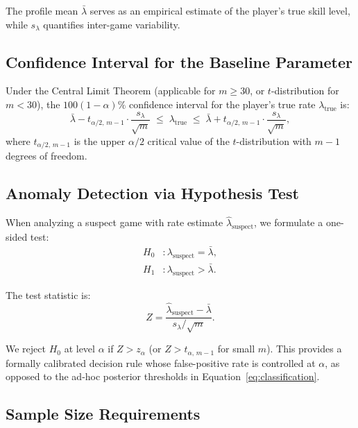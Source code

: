 \documentclass[11pt,a4paper]{article}
\begin{document}
The profile mean $\bar{\lambda}$ serves as an empirical estimate of the
player's true skill level, while $s_\lambda$ quantifies inter-game variability.

\subsection{Confidence Interval for the Baseline Parameter}
\label{sec:profile_ci}

Under the Central Limit Theorem (applicable for $m \geq 30$, or $t$-distribution
for $m < 30$), the $100(1-\alpha)\%$ confidence interval for the player's
true rate $\lambda_{\text{true}}$ is:
\begin{equation}
    \bar{\lambda} - t_{\alpha/2,\, m-1} \cdot \frac{s_\lambda}{\sqrt{m}}
    \;\leq\; \lambda_{\text{true}} \;\leq\;
    \bar{\lambda} + t_{\alpha/2,\, m-1} \cdot \frac{s_\lambda}{\sqrt{m}},
    \label{eq:profile_ci}
\end{equation}
where $t_{\alpha/2,\, m-1}$ is the upper $\alpha/2$ critical value of the
$t$-distribution with $m-1$ degrees of freedom.

\subsection{Anomaly Detection via Hypothesis Test}

When analyzing a suspect game with rate estimate $\hat{\lambda}_{\text{suspect}}$,
we formulate a one-sided test:
\begin{align}
    H_0 &: \lambda_{\text{suspect}} = \bar{\lambda}, \\
    H_1 &: \lambda_{\text{suspect}} > \bar{\lambda}.
\end{align}

The test statistic is:
\begin{equation}
    Z = \frac{\hat{\lambda}_{\text{suspect}} - \bar{\lambda}}
    {s_\lambda / \sqrt{m}}.
    \label{eq:profile_test}
\end{equation}

We reject $H_0$ at level $\alpha$ if $Z > z_\alpha$ (or $Z > t_{\alpha,\, m-1}$
for small $m$). This provides a formally calibrated decision rule whose
false-positive rate is controlled at $\alpha$, as opposed to the ad-hoc
posterior thresholds in Equation~\eqref{eq:classification}.

\subsection{Sample Size Requirements}
\label{sec:sample_size}
\end{document}
